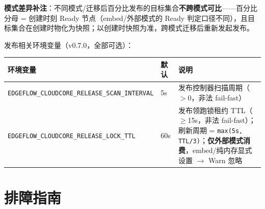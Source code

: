 \textbf{模式差异补注}：不同模式/迁移后百分比发布的目标集合\textbf{不跨模式可比}——百分比分母 = 创建时刻 Ready 节点（embed/外部模式的 Ready 判定口径不同），且目标集合在创建时物化为快照；以创建时快照为准，跨模式迁移后重新发起发布。

发布相关环境变量（v0.7.0，全部可选）：

\begin{tabularx}{\textwidth}{l l X}
  \toprule
  \textbf{环境变量} & \textbf{默认} & \textbf{说明} \\
  \midrule
  \texttt{EDGEFLOW\_CLOUDCORE\_RELEASE\_SCAN\_INTERVAL} & 5s & 发布控制器扫描周期（$>$0，非法 fail-fast） \\
  \texttt{EDGEFLOW\_CLOUDCORE\_RELEASE\_LOCK\_TTL} & 60s & 发布领跑锁租约 TTL（$\geq$15s，非法 fail-fast）；刷新周期 = \texttt{max(5s, TTL/3)}；\textbf{仅外部模式消费}，embed/纯内存显式设置 $\rightarrow$ Warn 忽略 \\
  \bottomrule
\end{tabularx}

\section{排障指南}

